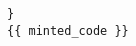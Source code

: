 \documentclass[varwidth]{standalone}
\begin{document}
\begin{verbatim}}
{{ minted_code }}
\end{verbatim}
\end{document}
